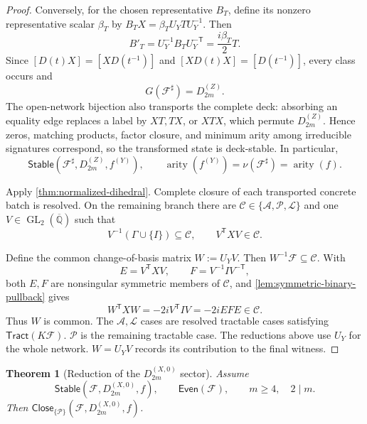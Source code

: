 \documentclass[11pt,letterpaper,onecolumn]{article}
\theoremstyle{plain}
\newtheorem{theorem}{Theorem}[section]
\theoremstyle{definition}
\theoremstyle{remark}
\newcommand{\AlgNums}{\overline{\mathbb Q}}
\newcommand{\cF}{\mathcal F}
\newcommand{\cA}{\mathscr A}
\newcommand{\cP}{\mathscr P}
\newcommand{\cL}{\mathscr L}
\newcommand{\cC}{\mathscr C}
\newcommand{\Tract}{\mathsf{Tract}}
\newcommand{\DihZ}[1]{{D_{#1}^{(Z)}}}
\newcommand{\DihXzero}[1]{{D_{#1}^{(X,0)}}}
\newcommand{\Stable}{\mathsf{Stable}}
\newcommand{\Even}{\mathsf{Even}}
\newcommand{\Close}{\mathsf{Close}}
\newcommand{\GL}{\operatorname{GL}}
\newcommand{\arity}{\operatorname{arity}}
\begin{document}
\begin{proof}
Conversely, for the chosen representative \(B_T\), define its
nonzero representative scalar \(\beta_T\) by
\(B_TX=\beta_TU_{Y}TU_{Y}^{-1}\).  Then
\begin{equation*}
 B'_T
 =U_{Y}^{-1}B_TU_{Y}^{-\mathsf T}
 =\frac{i\beta_T}{2}T.
\end{equation*}
Since \([D(t)X]=[XD(t^{-1})]\) and
\([XD(t)X]=[D(t^{-1})]\), every class occurs and
\begin{equation*}
 G(\cF^\sharp)=\DihZ{2m}.
\end{equation*}
The open-network bijection also transports the complete deck: absorbing an
equality edge replaces a label by \(XT,TX\), or \(XTX\), which permute
\(\DihZ{2m}\).  Hence zeros, matching products, factor closure, and
minimum arity among irreducible signatures correspond, so the transformed state is deck-stable.
In particular,
\[
 \Stable(\cF^\sharp,\DihZ{2m},f^{(Y)}),
 \qquad
 \arity(f^{(Y)})=\nu(\cF^\sharp)=\arity(f).
\]

Apply \cref{thm:normalized-dihedral}.  Complete closure of each transported
concrete batch is resolved.  On the remaining branch there are
\(\cC\in\{\cA,\cP,\cL\}\) and one \(V\in\GL_2(\AlgNums)\) such that
\[
 V^{-1}(\Gamma\cup\{I\})\subseteq\cC,
 \qquad V^{\mathsf T}XV\in\cC.
\]

Define the common change-of-basis matrix \(W:=U_{Y}V\). Then
\(W^{-1}\cF\subseteq\cC\).  With
\[
 E=V^{\mathsf T}XV,
 \qquad F=V^{-1}IV^{-\mathsf T},
\]
both \(E,F\) are nonsingular symmetric members of \(\cC\), and
\cref{lem:symmetric-binary-pullback} gives
\[
 W^{\mathsf T}XW
 =-2iV^{\mathsf T}IV
 =-2iEFE\in\cC.
\]
Thus \(W\) is common.  The \(\cA,\cL\) cases are resolved
tractable cases satisfying \(\Tract(K\cF)\). \(\cP\) is the remaining tractable case.
The reductions above use \(U_{Y}\) for the whole network.
\(W=U_{Y}V\) records its contribution to the final witness.
\end{proof}

\begin{theorem}[Reduction of the
  \texorpdfstring{\(\DihXzero{2m}\)}{D2m (X,0)} sector]
\label{thm:marked-A0-reduction}
Assume
\[
 \Stable(\cF,\DihXzero{2m},f),\qquad
 \Even(\cF),\qquad m\ge4,\quad 2\mid m.
\]
Then \(\Close_{\{\cP\}}(\cF,\DihXzero{2m},f)\).
\end{theorem}
\end{document}
